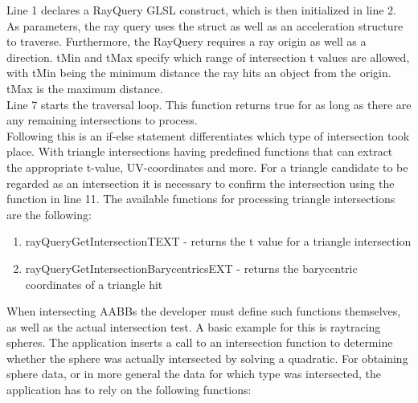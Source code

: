 Line 1 declares a RayQuery GLSL construct, which is then initialized in line 2.
As parameters, the ray query uses the struct as well as an acceleration structure to traverse.
Furthermore, the RayQuery requires a ray origin as well as a direction. tMin and tMax specify which range of intersection t values are allowed, with tMin being the minimum distance the ray hits an object from the origin. tMax is the maximum distance.\\
Line 7 starts the traversal loop. This function returns true for as long as there are any remaining intersections to process.\\
Following this is an if-else statement differentiates which type of intersection took place. With triangle intersections having predefined functions that can extract the appropriate t-value, UV-coordinates and more. For a triangle candidate to be regarded as an intersection it is necessary to confirm the intersection using the function in line 11. The available functions for processing triangle intersections are the following:\\
\begin{enumerate}
    \item rayQueryGetIntersectionTEXT - returns the t value for a triangle intersection
    \item rayQueryGetIntersectionBarycentricsEXT - returns the barycentric coordinates of a triangle hit
\end{enumerate}
When intersecting AABBs the developer must define such functions themselves, as well as the actual intersection test. A basic example for this is raytracing spheres. The application inserts a call to an intersection function to determine whether the sphere was actually intersected by solving a quadratic. For obtaining sphere data, or in more general the data for which type was intersected, the application has to rely on the following functions:\\
